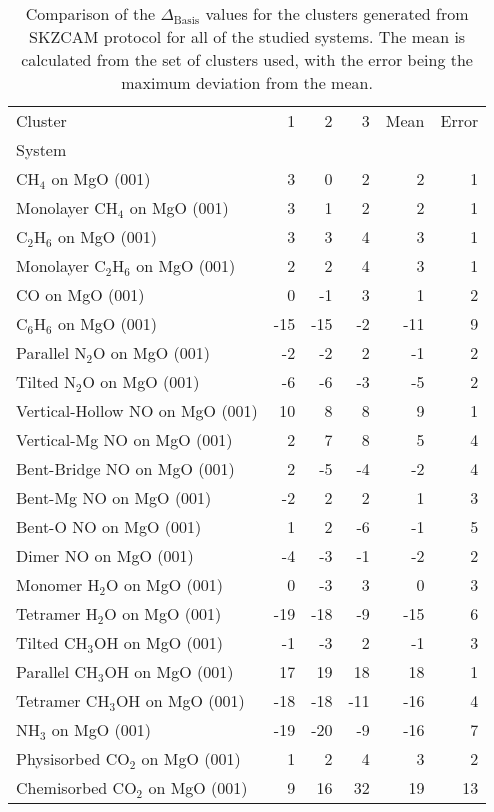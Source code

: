 \begin{table}
\caption{\label{tab:deltabasis}Comparison of the $\Delta_\textrm{Basis}$ values for the clusters generated from SKZCAM protocol for all of the studied systems. The mean is calculated from the set of clusters used, with the error being the maximum deviation from the mean.}
\begin{adjustbox}{center,max width=1\textwidth}
\begin{tabular}{lrrrrr}
\toprule
Cluster & 1 & 2 & 3 & Mean & Error \\ 
System &  &  &  &  &  \\
\midrule
CH$_4$ on MgO (001) & 3 & 0 & 2 & 2 & 1 \\
Monolayer CH$_4$ on MgO (001) & 3 & 1 & 2 & 2 & 1 \\
C$_2$H$_6$ on MgO (001) & 3 & 3 & 4 & 3 & 1 \\
Monolayer C$_2$H$_6$ on MgO (001) & 2 & 2 & 4 & 3 & 1 \\
CO on MgO (001) & 0 & -1 & 3 & 1 & 2 \\
C$_6$H$_6$ on MgO (001) & -15 & -15 & -2 & -11 & 9 \\
Parallel N$_2$O on MgO (001) & -2 & -2 & 2 & -1 & 2 \\
Tilted N$_2$O on MgO (001) & -6 & -6 & -3 & -5 & 2 \\
Vertical-Hollow NO on MgO (001) & 10 & 8 & 8 & 9 & 1 \\
Vertical-Mg NO on MgO (001) & 2 & 7 & 8 & 5 & 4 \\
Bent-Bridge NO on MgO (001) & 2 & -5 & -4 & -2 & 4 \\
Bent-Mg NO on MgO (001) & -2 & 2 & 2 & 1 & 3 \\
Bent-O NO on MgO (001) & 1 & 2 & -6 & -1 & 5 \\
Dimer NO on MgO (001) & -4 & -3 & -1 & -2 & 2 \\
Monomer H$_2$O on MgO (001) & 0 & -3 & 3 & 0 & 3 \\
Tetramer H$_2$O on MgO (001) & -19 & -18 & -9 & -15 & 6 \\
Tilted CH$_3$OH on MgO (001) & -1 & -3 & 2 & -1 & 3 \\
Parallel CH$_3$OH on MgO (001) & 17 & 19 & 18 & 18 & 1 \\
Tetramer CH$_3$OH on MgO (001) & -18 & -18 & -11 & -16 & 4 \\
NH$_3$ on MgO (001) & -19 & -20 & -9 & -16 & 7 \\
Physisorbed CO$_2$ on MgO (001) & 1 & 2 & 4 & 3 & 2 \\
Chemisorbed CO$_2$ on MgO (001) & 9 & 16 & 32 & 19 & 13 \\

\end{tabular}
\end{adjustbox}
\end{table}
